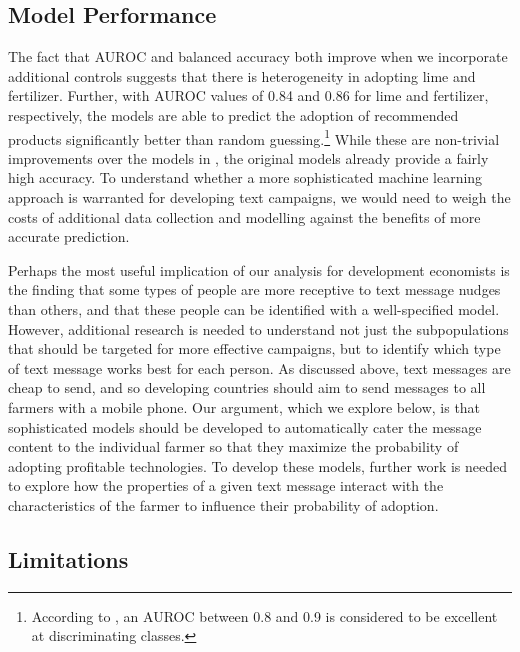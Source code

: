 \documentclass[12pt]{article}
\begin{document}
\subsection{Model Performance}
The fact that AUROC and balanced accuracy both improve when we incorporate additional controls suggests that there is heterogeneity in adopting lime and fertilizer. Further, with AUROC values of 0.84 and 0.86 for lime and fertilizer, respectively, the models are able to predict the adoption of recommended products significantly better than random guessing.\footnote{According to \textcite{mandrekar_receiver_2010}, an AUROC between 0.8 and 0.9 is considered to be excellent at discriminating classes.} While these are non-trivial improvements over the models in \textcite{fabregas_digital_2025}, the original models already provide a fairly high accuracy. To understand whether a more sophisticated machine learning approach is warranted for developing text campaigns, we would need to weigh the costs of additional data collection and modelling against the benefits of more accurate prediction.

Perhaps the most useful implication of our analysis for development economists is the finding that some types of people are more receptive to text message nudges than others, and that these people can be identified with a well-specified model. However, additional research is needed to understand not just the subpopulations that should be targeted for more effective campaigns, but to identify which type of text message works best for each person. As discussed above, text messages are cheap to send, and so developing countries should aim to send messages to all farmers with a mobile phone. Our argument, which we explore below, is that sophisticated models should be developed to automatically cater the message content to the individual farmer so that they maximize the probability of adopting profitable technologies. To develop these models, further work is needed to explore how the properties of a given text message interact with the characteristics of the farmer to influence their probability of adoption.

\subsection{Limitations}
\end{document}
